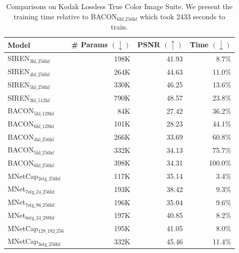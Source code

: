\begin{table}[!h]
\centering
\small
\begin{tabular}{|l|r|r|r|}
\hline
Model                    & \# Params $(\downarrow)$ & PSNR $(\uparrow)$ & Time $(\downarrow)$ \\
\hline
SIREN$_\text{3hl\_256hf}$        & 198K      & 41.93    & 8.7\%       \\
SIREN$_\text{4hl\_256hf}$        & 264K      & 44.63    & 11.0\%      \\
SIREN$_\text{5hl\_256hf}$        & 330K      & 46.25    & 13.6\%      \\
SIREN$_\text{3hl\_512hf}$        & 790K      & 48.57    & 23.8\%      \\
\hline
BACON$_\text{5hl\_128hf}$        & 84K       & 27.42    & 36.2\%      \\
BACON$_\text{6hl\_128hf}$        & 101K      & 28.23    & 44.1\%      \\
BACON$_\text{4hl\_256hf}$        & 266K      & 33.69    & 60.8\%      \\
BACON$_\text{5hl\_256hf}$        & 332K      & 34.13    & 75.7\%      \\
BACON$_\text{6hl\_256hf}$        & 398K      & 34.31    & 100.0\%     \\
\hline
MNetCap$_\text{2stg\_256hf}$    & 117K      & 35.14    & 3.4\%       \\
MNet$_\text{7stg\_24\_256hf}$          & 193K      & 38.42    & 9.3\%       \\
MNet$_\text{7stg\_96\_256hf}$          & 196K      & 35.04    & 9.6\%       \\
MNet$_\text{6stg\_24\_288hf}$          & 197K      & 40.85    & 8.2\%       \\
MNetCap$_\text{128\_192\_256}$ & 195K      & 41.05    & 8.0\%       \\
MNetCap$_\text{3stg\_256hf}$           & 332K      & 45.46    & 11.4\%     \\
\hline
\end{tabular}
\caption{\label{tab:kodak} Comparisons on Kodak Lossless True Color Image Suite. We present the training time relative to BACON$_\text{6hl\_256hf}$ which took 2433 seconds to train.}
\label{t:kodak}
\end{table}


